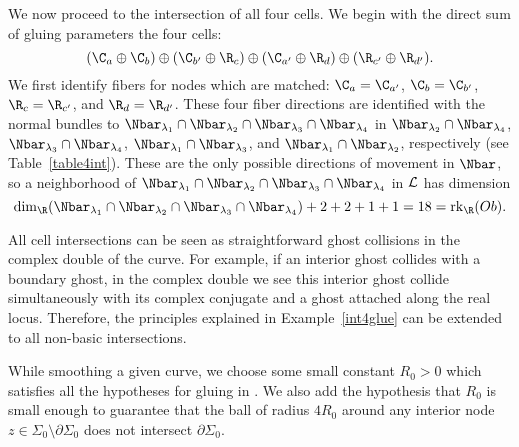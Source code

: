 \begin{example}
We now proceed to the intersection of all four cells. 
We begin with the direct sum of gluing parameters the four cells:
\[
(\C_a \oplus \C_b) \oplus (\C_{b'} \oplus \R_c) \oplus (\C_{a'} \oplus \R_d) \oplus (\R_{c'} \oplus \R_{d'}).
\]
We first identify fibers for nodes which are matched: $\C_a=\C_{a'}$, $\C_b=\C_{b'}$, $\R_c=\R_{c'}$, and $\R_d=\R_{d'}$. These four fiber directions are identified with the normal bundles to $\Nbar_{\lambda_1} \cap \Nbar_{\lambda_2}  \cap \Nbar_{\lambda_3} \cap \Nbar_{\lambda_4}$ in $\Nbar_{\lambda_2} \cap \Nbar_{\lambda_4}$, $\Nbar_{\lambda_3} \cap \Nbar_{\lambda_4}$, $\Nbar_{\lambda_1} \cap \Nbar_{\lambda_3}$, and $\Nbar_{\lambda_1} \cap \Nbar_{\lambda_2}$, respectively (see Table~\ref{table4int}). These are the only possible directions of movement in $\Nbar$, so a neighborhood of $\Nbar_{\lambda_1} \cap \Nbar_{\lambda_2}  \cap \Nbar_{\lambda_3} \cap \Nbar_{\lambda_4}$ in $\mathcal{L}$ has dimension
\[
\dim_\R(\Nbar_{\lambda_1} \cap \Nbar_{\lambda_2}  \cap \Nbar_{\lambda_3} \cap \Nbar_{\lambda_4})+2+2+1+1=18=\rk_\R(Ob).
\]
\end{example}

\begin{remark}
All cell intersections can be seen as straightforward ghost collisions in the complex double of the curve. For example, if an interior ghost collides with a boundary ghost, in the complex double we see this interior ghost collide simultaneously with its complex conjugate and a ghost attached along the real locus. Therefore, the principles explained in Example~\ref{int4glue} can be extended to all non-basic intersections.
\end{remark}

While smoothing a given curve, we choose some small constant $R_0>0$ which satisfies all the hypotheses for gluing in \cite{dw}. We also add the hypothesis that $R_0$ is small enough to guarantee that the ball of radius $4R_0$ around any interior node $z \in \Sigma_0\setminus\partial\Sigma_0$ does not intersect $\partial\Sigma_0$.


